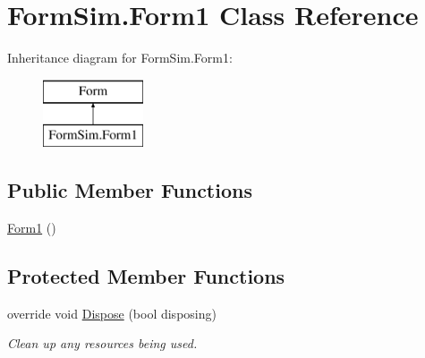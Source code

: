 \hypertarget{class_form_sim_1_1_form1}{}\section{Form\+Sim.\+Form1 Class Reference}
\label{class_form_sim_1_1_form1}
Inheritance diagram for Form\+Sim.\+Form1\+:\begin{figure}[H]
\begin{center}
\leavevmode
\includegraphics[height=2.000000cm]{class_form_sim_1_1_form1}
\end{center}
\end{figure}
\subsection*{Public Member Functions}
\begin{DoxyCompactItemize}
\item 
\mbox{\hyperlink{class_form_sim_1_1_form1_aaf140bd5cccdffe2b9f6c4a9b856b5ca}{Form1}} ()
\end{DoxyCompactItemize}
\subsection*{Protected Member Functions}
\begin{DoxyCompactItemize}
\item 
override void \mbox{\hyperlink{class_form_sim_1_1_form1_a5ab3d8b7fa32d3c15b3690d53104deae}{Dispose}} (bool disposing)
\begin{DoxyCompactList}\small\item\em Clean up any resources being used. \end{DoxyCompactList}\end{DoxyCompactItemize}
